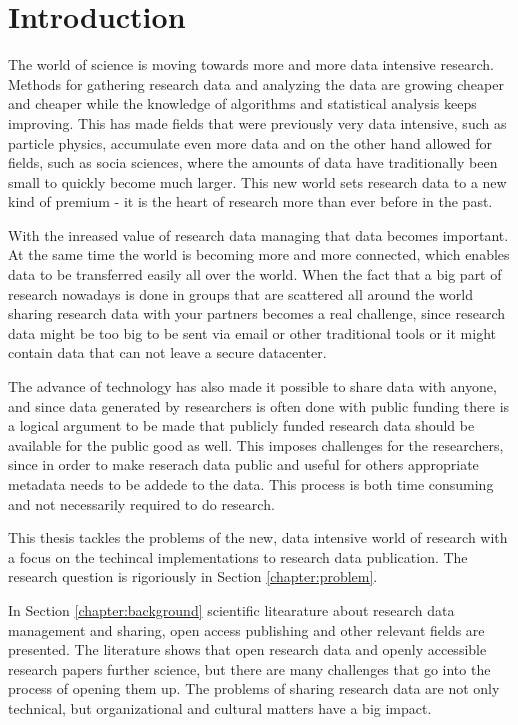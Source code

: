 \chapter{Introduction}
\label{chapter:intro}

The world of science is moving towards more and more data intensive research.
Methods for gathering research data and analyzing the data are growing
cheaper and cheaper while the knowledge of algorithms and statistical analysis
keeps improving. This has made fields that were previously very data intensive,
such as particle physics, accumulate even more data and on the other hand
allowed for fields, such as socia sciences, where the amounts of data have
traditionally been small to quickly become much larger. This new world sets
research data to a new kind of premium - it is the heart of research more
than ever before in the past.

With the inreased value of research data managing that data becomes important.
At the same time the world is becoming more and more connected, which enables
data to be transferred easily all over the world. When the fact that a big
part of research nowadays is done in groups that are scattered all around the
world sharing research data with your partners becomes a real challenge, since
research data might be too big to be sent via email or other traditional tools
or it might contain data that can not leave a secure datacenter.

The advance of technology has also made it possible to share data with anyone,
and since data generated by researchers is often done with public funding there
is a logical argument to be made that publicly funded research data should be
available for the public good as well. This imposes challenges for the
researchers, since in order to make reserach data public and useful for others
appropriate metadata needs to be addede to the data. This process is both
time consuming and not necessarily required to do research.

This thesis tackles the problems of the new, data intensive world of research
with a focus on the techincal implementations to research data publication.
The research question is rigoriously in Section \ref{chapter:problem}.

In Section \ref{chapter:background} scientific litearature about research data
management and sharing, open access publishing and other relevant fields are
presented. The literature shows that open research data and openly accessible
research papers further science, but there are many challenges that go into
the process of opening them up. The problems of sharing research data are not
only technical, but organizational and cultural matters have a big impact.

